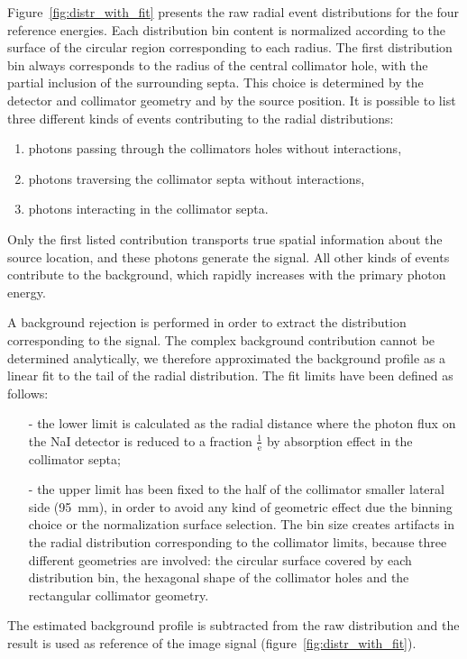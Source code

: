Figure~\ref{fig:distr_with_fit} presents the raw radial event distributions for the four reference energies. Each distribution bin content is normalized according to the surface of the circular region corresponding to each radius. The first distribution bin always corresponds to the radius of the central collimator hole, with the partial inclusion of the surrounding septa. This choice is determined by the detector and collimator geometry and by the source position. It is possible to list three different kinds of events contributing to the radial distributions:
\begin{enumerate}
\item photons passing through the collimators holes without interactions,
\item photons traversing the collimator septa without interactions,
\item photons interacting in the collimator septa.
\end{enumerate} 
Only the first listed contribution transports true spatial information about the source location, and these photons generate the signal. All other kinds of events contribute to the background, which rapidly increases with the primary photon energy.

A background rejection is performed in order to extract the distribution corresponding to the signal. The complex background contribution cannot be determined analytically, we therefore approximated the background profile as a linear fit to the tail of the radial distribution. The fit limits have been defined as follows:
\begin{itemize}
\item[-] the lower limit is calculated as the radial distance where the photon flux on the NaI detector is reduced to a fraction $\mathrm{\frac{1}{e}}$ by absorption effect in the collimator septa;
\item[-] the upper limit has been fixed to the half of the collimator smaller lateral side (95~mm), in order to avoid any kind of geometric effect due the binning choice or the normalization surface selection. The bin size creates artifacts in the radial distribution corresponding to the collimator limits, because three different geometries are involved: the circular surface covered by each distribution bin, the hexagonal shape of the collimator holes and the rectangular collimator geometry.
\end{itemize}
The estimated background profile is subtracted from the raw distribution and the result is used as reference of the image signal (figure~\ref{fig:distr_with_fit}).


